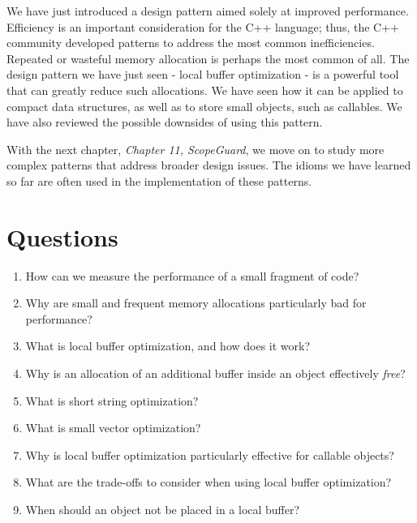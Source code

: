 We have just introduced a design pattern aimed solely at improved performance. Efficiency is an important consideration for the C++ language; thus, the C++ community developed patterns to address the most common inefficiencies. Repeated or wasteful memory allocation is perhaps the most common of all. The design pattern we have just seen - local buffer optimization - is a powerful tool that can greatly reduce such allocations. We have seen how it can be applied to compact data structures, as well as to store small objects, such as callables. We have also reviewed the possible downsides of using this pattern.

With the next chapter, \emph{Chapter 11, ScopeGuard}, we move on to study more complex patterns that address broader design issues. The idioms we have learned so far are often used in the implementation of these patterns.

\section{Questions}

\begin{enumerate}
\item
  How can we measure the performance of a small fragment of code?
\item
  Why are small and frequent memory allocations particularly bad for performance?
\item
  What is local buffer optimization, and how does it work?
\item
  Why is an allocation of an additional buffer inside an object effectively \emph{free}?
\item
  What is short string optimization?
\item
  What is small vector optimization?
\item
  Why is local buffer optimization particularly effective for callable objects?
\item
  What are the trade-offs to consider when using local buffer optimization?
\item
  When should an object not be placed in a local buffer?
\end{enumerate}

